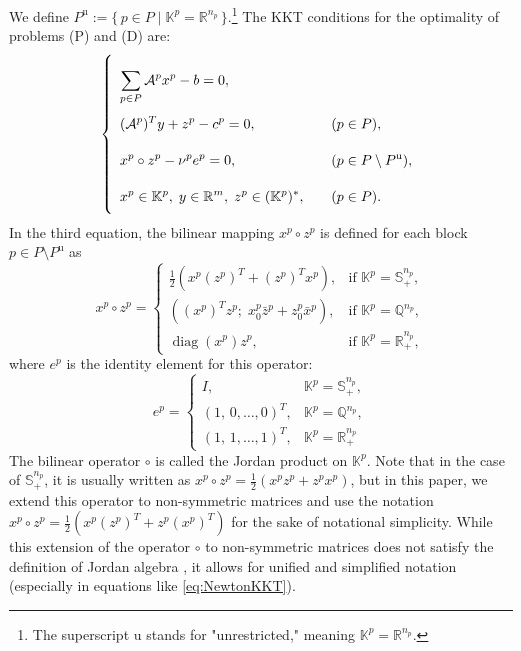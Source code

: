 We define $P^{\text{u}} := \{\, p \in P \mid \mathbb{K}^p = \mathbb{R}^{n_p} \,\}$.\footnote{%
  The superscript $\text{u}$ stands for "unrestricted," meaning $\mathbb{K}^p = \mathbb{R}^{n_p}$.
}
The KKT conditions for the optimality of problems (P) and (D) are:
\begin{equation}
    \everymath{\displaystyle}
    \renewcommand{\arraystretch}{2.5}
    \left\{
    \begin{array}{ll}
        \sum_{p \in P} \mathcal{A}^p x^p - b = 0, & \\[-4pt]
        (\mathcal{A}^p)^T y + z^p - c^p = 0, & \quad (p \in P),\\[-4pt]
        x^p \circ z^p - \nu^p e^p = 0, & \quad (p \in P \setminus P^{\text{u}}),\\[-4pt]
        x^p \in \mathbb{K}^p,\; y \in \mathbb{R}^m,\; z^p \in (\mathbb{K}^p)^*, & \quad (p \in P).
    \end{array}
    \right.
    \label{eq:KKTcond}
\end{equation}
In the third equation, the bilinear mapping $x^p \circ z^p$ is defined for each block $p \in P \setminus P^{\text{u}}$ as
\[
  x^p \circ z^p = 
  \begin{cases}
    \frac{1}{2} \left( x^p (z^p)^T + (z^p)^T x^p \right), 
      & \text{if } \mathbb{K}^p = \mathbb{S}^{n_p}_+,\\[4pt]
    \left( (x^p)^T z^p;\; x^p_0 \bar{z}^p + z^p_0 \bar{x}^p \right),
      & \text{if } \mathbb{K}^p = \mathbb{Q}^{n_p},\\[4pt]
    \operatorname{diag}(x^p) z^p,
      & \text{if } \mathbb{K}^p = \mathbb{R}^{n_p}_+,
  \end{cases}
\]
where $e^p$ is the identity element for this operator:
\[
  e^p = 
  \begin{cases}
    I, & \mathbb{K}^p = \mathbb{S}^{n_p}_+,\\[3pt]
    (1,\,0,\ldots,0)^T, & \mathbb{K}^p = \mathbb{Q}^{n_p},\\[3pt]
    (1,\,1,\ldots,1)^T, & \mathbb{K}^p = \mathbb{R}^{n_p}_+ %
  \end{cases}
\]
The bilinear operator $\circ$ is called the Jordan product on $\mathbb{K}^p$.
Note that in the case of $\mathbb{S}^{n_p}_+$, it is usually written as $x^p \circ z^p = \frac{1}{2}(x^p z^p + z^p x^p)$, 
but in this paper, we extend this operator to non-symmetric matrices and use the notation $x^p \circ z^p = \frac{1}{2} \left( x^p (z^p)^T + z^p (x^p)^T \right)$ for the sake of notational simplicity.
While this extension of the operator $\circ$ to non-symmetric matrices does not satisfy the definition of Jordan algebra \cite{Faraut1994}, it allows for unified and simplified notation (especially in equations like \eqref{eq:NewtonKKT}).

